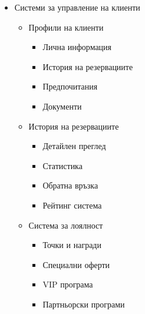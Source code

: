 \documentclass[12pt,a4paper]{article}
\begin{document}
\begin{itemize}
    \item Системи за управление на клиенти
    \begin{itemize}
        \item Профили на клиенти
        \begin{itemize}
            \item Лична информация
            \item История на резервациите
            \item Предпочитания
            \item Документи
        \end{itemize}
        \item История на резервациите
        \begin{itemize}
            \item Детайлен преглед
            \item Статистика
            \item Обратна връзка
            \item Рейтинг система
        \end{itemize}
        \item Система за лоялност
        \begin{itemize}
            \item Точки и награди
            \item Специални оферти
            \item VIP програма
            \item Партньорски програми
        \end{itemize}
    \end{itemize}
    

\end{itemize}
\end{document}
